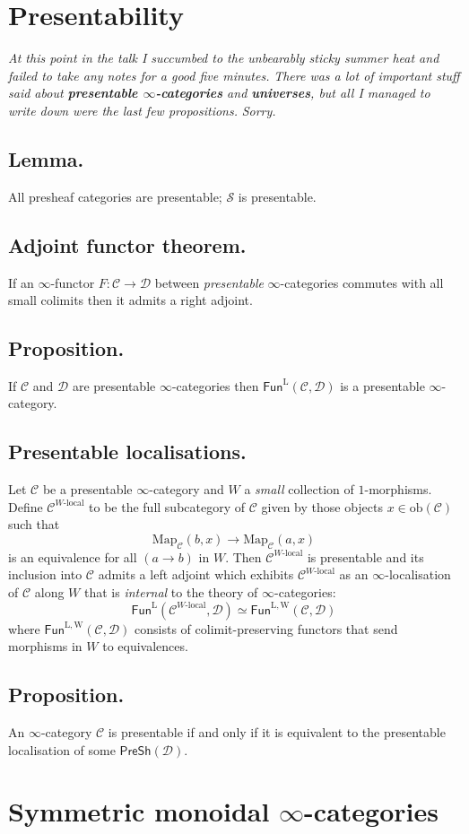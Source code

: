 \documentclass{article}
\numberwithin{equation}{subsection}
\renewcommand{\ss}[1]{\subsection{#1}}
\newcommand{\C}{\mathcal{C}}
\newcommand{\D}{\mathcal{D}}
\newcommand{\Map}{\mathrm{Map}}
\renewcommand{\S}{\mathcal{S}}
\renewcommand{\P}{\mathsf{PreSh}}
\begin{document}
    \section{Presentability}

        \emph{At this point in the talk I succumbed to the unbearably sticky summer heat and failed to take any notes for a good five minutes.}
        \emph{There was a lot of important stuff said about \textbf{presentable $\infty$-categories} and \textbf{universes}, but all I managed to write down were the last few propositions.}
        \emph{Sorry.}

        \ss{Lemma.}
            All presheaf categories are presentable; $\S$ is presentable.

        \ss{Adjoint functor theorem.}
            If an $\infty$-functor $F\colon\C\to\D$ between \emph{presentable} $\infty$-categories commutes with all small colimits then it admits a right adjoint.

        \ss{Proposition.}
            If $\C$ and $\D$ are presentable $\infty$-categories then $\mathsf{Fun}^\mathrm{L}(\C,\D)$ is a presentable $\infty$-category.

        \ss{Presentable localisations.}
            Let $\C$ be a presentable $\infty$-category and $W$ a \emph{small} collection of $1$-morphisms.
            Define $\C^{W\text{-local}}$ to be the full subcategory of $\C$ given by those objects $x\in\mathrm{ob}(\C)$ such that
            \[
                \Map_\C(b,x)\to\Map_\C(a,x)
            \]
            is an equivalence for all $(a\to b)$ in $W$.
            Then $\C^{W\text{-local}}$ is presentable and its inclusion into $\C$ admits a left adjoint which exhibits $\C^{W\text{-local}}$ as an $\infty$-localisation of $\C$ along $W$ that is \emph{internal} to the theory of $\infty$-categories:
            \[
                \mathsf{Fun}^\mathrm{L}(\C^{W\text{-local}},\D) \simeq \mathsf{Fun}^\mathrm{L,W}(\C,\D)
            \]
            where $\mathsf{Fun}^\mathrm{L,W}(\C,\D)$ consists of colimit-preserving functors that send morphisms in $W$ to equivalences.

        \ss{Proposition.}
            An $\infty$-category $\C$ is presentable if and only if it is equivalent to the presentable localisation of some $\P(\D)$.

    \section{Symmetric monoidal $\infty$-categories}
\end{document}
